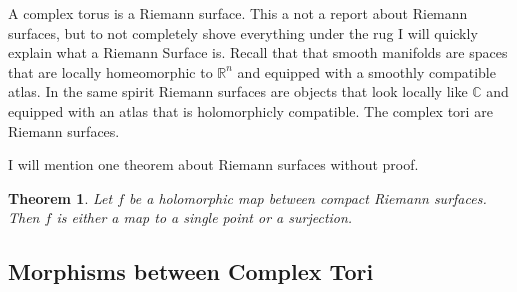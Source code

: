 \documentclass[a4paper]{article}
\theoremstyle{theoremdd}
\newtheorem{theorem}{Theorem}[section]
\theoremstyle{definitiondd}
\theoremstyle{remarkdd}
\newcommand{\C}{\mathbb{C}}
\newcommand{\R}{\mathbb{R}}
\begin{document}
A complex torus is a Riemann surface. This a not a report about Riemann surfaces, but to not completely shove everything under the rug I will quickly explain what a Riemann Surface is.
Recall that that smooth manifolds are spaces that are locally homeomorphic to $\R^{n}$ and equipped with a smoothly compatible atlas. 
In the same spirit Riemann surfaces are objects that look locally like $\C$ and equipped with an atlas that is holomorphicly compatible.
The complex tori are Riemann surfaces. 

I will mention one theorem about Riemann surfaces without proof. 
\begin{theorem}
	Let $f$ be a holomorphic map between compact Riemann surfaces. Then $f$ is either a map to a single point or a surjection.
\end{theorem}

\subsection{Morphisms between Complex Tori}
\end{document}
